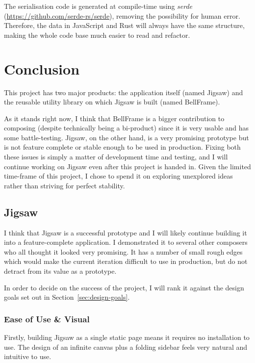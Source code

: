 \documentclass[12pt]{article}
\begin{document}
The serialisation code is generated at compile-time using \emph{serde}
(\url{https://github.com/serde-rs/serde}), removing the possibility for human error.  Therefore, the
data in JavaScript and Rust will always have the same structure, making the whole code base much
easier to read and refactor.



\pagebreak

\section{Conclusion}

This project has two major products: the application itself (named Jigsaw) and the reusable utility
library on which Jigsaw is built (named BellFrame).

As it stands right now, I think that BellFrame is a bigger contribution to composing (despite
technically being a bi-product) since it is very usable and has some battle-testing.  Jigsaw, on
the other hand, is a very promising prototype but is not feature complete or stable enough to be
used in production.  Fixing both these issues is simply a matter of development time and testing, 
and I will continue working on Jigsaw even after this project is handed in.  Given the limited
time-frame of this project, I chose to spend it on exploring unexplored ideas rather than striving
for perfect stability.

\subsection{Jigsaw}

I think that Jigsaw is a successful prototype and I will likely continue building it into a
feature-complete application.  I demonstrated it to several other composers who all thought it
looked very promising.  It has a number of small rough edges which would make the current iteration
difficult to use in production, but do not detract from its value as a prototype.

In order to decide on the success of the project, I will rank it against the design goals set out in
Section~\ref{sec:design-goals}.

\subsubsection{Ease of Use \& Visual}

Firstly, building Jigsaw as a single static page means it requires no installation to use.  The
design of an infinite canvas plus a folding sidebar feels very natural and intuitive to use.
\end{document}
